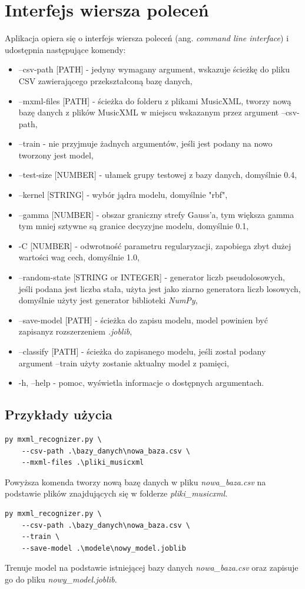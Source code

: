 \documentclass[printmode, eng]{mgr}
\newcommand\tab[1][1cm]{\hspace*{#1}}
\begin{document}
\section{Interfejs wiersza poleceń}
\tab Aplikacja opiera się o interfejs wiersza poleceń (ang. \textit{command line interface}) i udostępnia następujące komendy:
\begin{itemize}
\item --csv-path [PATH] - jedyny wymagany argument, wskazuje ścieżkę do pliku CSV zawierającego przekształconą bazę danych,
\item --mxml-files [PATH] - ścieżka do folderu z plikami MusicXML, tworzy nową bazę danych z plików MusicXML w miejscu wskazanym przez argument --csv-path,
\item --train - nie przyjmuje żadnych argumentów, jeśli jest podany na nowo tworzony jest model,
\item --test-size [NUMBER] - ułamek grupy testowej z bazy danych, domyślnie 0.4,
\item --kernel [STRING] - wybór jądra modelu, domyślnie "rbf",
\item --gamma [NUMBER] - obszar graniczny strefy Gauss'a, tym większa gamma tym mniej sztywne są granice decyzyjne modelu, domyślnie 0.1, 
\item -C [NUMBER] - odwrotność parametru regularyzacji, zapobiega zbyt dużej wartości wag cech, domyślnie 1.0, 
\item --random-state [STRING or INTEGER] - generator liczb pseudolosowych, jeśli podana jest liczba stała, użyta jest jako ziarno generatora liczb losowych, domyślnie użyty jest generator biblioteki \textit{NumPy},
\item --save-model [PATH] - ścieżka do zapisu modelu, model powinien być zapisany\linebreak z rozszerzeniem \textit{.joblib},
\item --classify [PATH] - ścieżka do zapisanego modelu, jeśli został podany argument --train użyty zostanie aktualny model z pamięci,
\item -h, --help - pomoc, wyświetla informacje o dostępnych argumentach.
\end{itemize}
\subsection{Przykłady użycia}
\begin{lstlisting}
py mxml_recognizer.py \
	--csv-path .\bazy_danych\nowa_baza.csv \
	--mxml-files .\pliki_musicxml 
\end{lstlisting}
Powyższa komenda tworzy nową bazę danych w pliku \textit{nowa\_baza.csv} na podstawie plików znajdujących się w folderze \textit{pliki\_musicxml}.
\begin{lstlisting}
py mxml_recognizer.py \
	--csv-path .\bazy_danych\nowa_baza.csv \
	--train \
	--save-model .\modele\nowy_model.joblib
\end{lstlisting}
Trenuje model na podstawie istniejącej bazy danych 
\textit{nowa\_baza.csv} oraz zapisuje go do pliku \textit{nowy\_model.joblib}.
\end{document}
